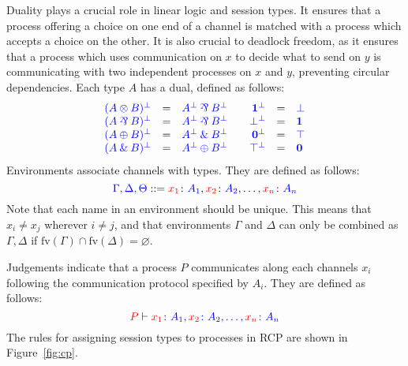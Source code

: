 \documentclass[a4paper,UKenglish]{lipics-v2016}
\begin{document}
Duality plays a crucial role in linear logic and session types. It ensures that
a process offering a choice on one end of a channel is matched with a process
which accepts a choice on the other. It is also crucial to deadlock freedom, as
it ensures that a process which uses communication on $x$ to decide what to send
on $y$ is communicating with two independent processes on $x$ and $y$,
preventing circular dependencies. Each type $A$ has a dual, defined as follows:
\[
  \begin{array}{rclcrcl}
    \tm{( A \tens B )^\bot} &=& \tm{A^\bot \parr B^\bot}&&
    \tm{\one^\bot}          &=& \tm{\bot}\\
    \tm{( A \parr B )^\bot} &=& \tm{A^\bot \parr B^\bot}&&
    \tm{\bot^\bot}          &=& \tm{\one}\\
    \tm{( A \plus B )^\bot} &=& \tm{A^\bot \with B^\bot}&&
    \tm{\nil^\bot}          &=& \tm{\top}\\
    \tm{( A \with B )^\bot} &=& \tm{A^\bot \plus B^\bot}&&
    \tm{\top^\bot}          &=& \tm{\nil}
  \end{array}
\]
Environments associate channels with types. They are defined as follows:
\[
  \blue{\Gamma},\blue{\Delta},\blue{\Theta} ::=
  \tm[x_1]{A_1},\tm[x_2]{A_2},\dots,\tm[x_n]{A_n}
\]
Note that each name in an environment should be unique. This means that $x_i
\neq x_j$ wherever $i \neq j$, and that environments $\Gamma$ and $\Delta$ can
only be combined as $\Gamma, \Delta$ if $\text{fv}(\Gamma) \cap
\text{fv}(\Delta) = \varnothing$. 

Judgements indicate that a process $P$ communicates along each channels $x_i$
following the communication protocol specified by $A_i$. They are defined as
follows:
\[
  \seq[{ P }]{ \tm[x_1]{A_1},\tm[x_2]{A_2},\dots,\tm[x_n]{A_n} }
\]
The rules for assigning session types to processes in RCP are shown in
Figure~\ref{fig:cp}.
%

\end{document}
